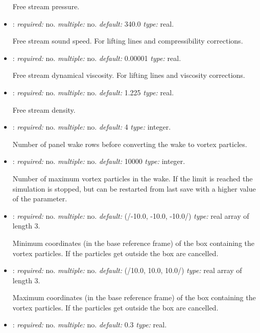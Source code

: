 \begin{itemize}
Free stream pressure.

\item {}: \textit{required:} no. \textit{multiple:} no. \textit{default:} 340.0 \textit{type:} real.

Free stream sound speed. For lifting lines and compressibility corrections.


\item {}: \textit{required:} no. \textit{multiple:} no. \textit{default:} 0.00001 \textit{type:} real.

Free stream dynamical viscosity. For lifting lines and viscosity corrections.

\item {}: \textit{required:} no. \textit{multiple:} no. \textit{default:} 1.225 \textit{type:} real.

Free stream density.

\item {}: \textit{required:} no. \textit{multiple:} no. \textit{default:} 4 \textit{type:} integer.

Number of panel wake rows before converting the wake to vortex particles.


\item {}: \textit{required:} no. \textit{multiple:} no. \textit{default:} 10000 \textit{type:} integer.

Number of maximum vortex particles in the wake. If the limit is reached the simulation is stopped, but can be restarted from last save with a higher value of the parameter. 


\item {}: \textit{required:} no. \textit{multiple:} no. \textit{default:} (/-10.0, -10.0, -10.0/) \textit{type:} real array of length 3.

Minimum coordinates (in the base reference frame) of the box containing the vortex particles. If the particles get outside the box are cancelled.

\item {}: \textit{required:} no. \textit{multiple:} no. \textit{default:} (/10.0, 10.0, 10.0/) \textit{type:} real array of length 3.

Maximum coordinates (in the base reference frame) of the box containing the vortex particles. If the particles get outside the box are cancelled.

\item {}: \textit{required:} no. \textit{multiple:} no. \textit{default:} 0.3 \textit{type:} real.


\end{itemize}

